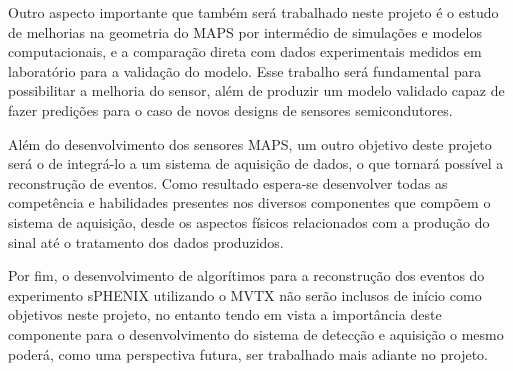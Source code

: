 Outro aspecto importante que também será trabalhado neste projeto é o estudo de melhorias na geometria do MAPS por intermédio de simulações e modelos computacionais, e a comparação direta com dados experimentais medidos em laboratório para a validação do modelo. Esse trabalho será fundamental para possibilitar a melhoria do sensor, além de produzir um modelo validado capaz de fazer predições para o caso de novos designs de sensores semicondutores. 

Além do desenvolvimento dos sensores MAPS, um outro objetivo deste projeto será o de integrá-lo a um sistema de aquisição de dados, o que tornará possível a reconstrução de eventos. Como resultado espera-se desenvolver todas as competência e habilidades presentes nos diversos componentes que compõem o sistema de aquisição, desde os aspectos físicos relacionados com a produção do sinal até o tratamento dos dados produzidos.

Por fim, o desenvolvimento de algorítimos para a reconstrução dos eventos do experimento sPHENIX utilizando o MVTX não serão inclusos de início como objetivos neste projeto, no entanto tendo em vista a importância deste componente para o desenvolvimento do sistema de detecção e aquisição o mesmo poderá, como uma perspectiva futura, ser trabalhado mais adiante no projeto. 


\renewcommand{\cleardoublepage}{}
\renewcommand{\clearpage}{}